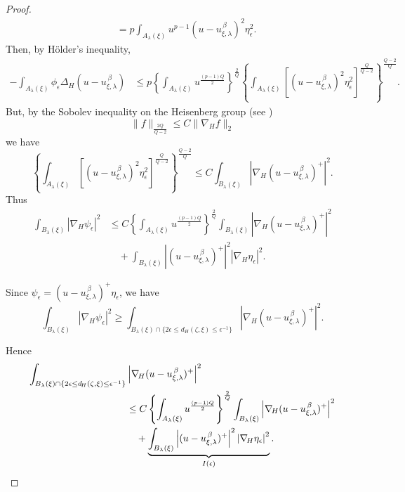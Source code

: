 \documentclass[reqno]{amsart}
\theoremstyle{definition}
\theoremstyle{remark}
\numberwithin{equation}{section}
\begin{document}
\begin{proof}
\begin{align*}
&= p \int_{A_{\lambda}(\xi)} u^{p-1} (u - u_{\xi,\lambda}^{\,\beta})^2 \eta_{\epsilon}^2.
\end{align*}
Then, by H\"older's inequality,
\begin{align*}
- \int_{A_{\lambda}(\xi)} \phi_{\epsilon} \Delta_{\! H} (u - u_{\xi,\lambda}^{\,\beta}) 
&\leq p \left\{ \int_{A_{\lambda}(\xi)} u^{\frac{(p-1)Q}{2}} \right\}^{\frac{2}{Q}} 
\left\{ \int_{A_{\lambda}(\xi)} \left[ (u - u_{\xi,\lambda}^{\,\beta})^2 \eta_{\epsilon}^2 \right]^{\frac{Q}{Q-2}} \right\}^{\frac{Q-2}{Q}}.
\end{align*}
But, by the Sobolev inequality on the Heisenberg group (see \cite{FS74})
\begin{equation}
 \label{sobol1}
\|f\|_{\frac{2Q}{Q-2}} \leq C \|\nabla_{\! H}f\|_2
\end{equation}
we have
\[
\left\{ \int_{A_{\lambda}(\xi)} \left[ (u - u_{\xi,\lambda}^{\,\beta})^2 \eta_{\epsilon}^2 \right]^{\frac{Q}{Q-2}} \right\}^{\frac{Q-2}{Q}}
\leq C \int_{B_{\lambda}(\xi)} \left| \nabla_{\! H} (u - u_{\xi,\lambda}^{\,\beta})^{+} \right|^2.
\]
Thus
\begin{align*}
\int_{B_{\lambda}(\xi)} \left| \nabla_{\! H} \psi_{\epsilon} \right|^2 
&\leq C \left\{ \int_{A_{\lambda}(\xi)} u^{\frac{(p-1)Q}{2}} \right\}^{\frac{2}{Q}} 
\int_{B_{\lambda}(\xi)} \left| \nabla_{\! H} (u - u_{\xi,\lambda}^{\,\beta})^{+} \right|^2 \\
&\quad + \int_{B_{\lambda}(\xi)} \left| (u - u_{\xi,\lambda}^{\,\beta})^{+} \right|^2 \left| \nabla_{\! H} \eta_{\epsilon} \right|^2.
\end{align*}

Since $\psi_{\epsilon} = (u - u_{\xi,\lambda}^{\,\beta})^{+} \eta_{\epsilon}$, we have
\[
\int_{B_{\lambda}(\xi)} \left| \nabla_{\! H} \psi_{\epsilon} \right|^2 
\geq \int_{B_{\lambda}(\xi) \cap \{2\epsilon \leq d_{\! H}(\zeta,\xi) \leq \epsilon^{-1}\}} 
\left| \nabla_{\! H} (u - u_{\xi,\lambda}^{\,\beta})^{+} \right|^2.
\]

Hence
\begin{align}\label{eqn:nablaest}
\int_{B_{\lambda}(\xi) \cap \{2\epsilon \leq d_{\! H}(\zeta,\xi) \leq \epsilon^{-1}\}} 
& \left| \nabla_{\! H} (u - u_{\xi,\lambda}^{\,\beta})^{+} \right|^2 \notag \\
& \leq C \left\{ \int_{A_{\lambda}(\xi)} u^{\frac{(p-1)Q}{2}} \right\}^{\frac{2}{Q}} 
\int_{B_{\lambda}(\xi)} \left| \nabla_{\! H} (u - u_{\xi,\lambda}^{\,\beta})^{+} \right|^2 \notag \\
& \quad + \underbrace{\int_{B_{\lambda}(\xi)} \left| (u - u_{\xi,\lambda}^{\,\beta})^{+} \right|^2 \left| \nabla_{\! H} \eta_{\epsilon} \right|^2}_{I(\epsilon)}.
\end{align}


\end{proof}
\end{document}
